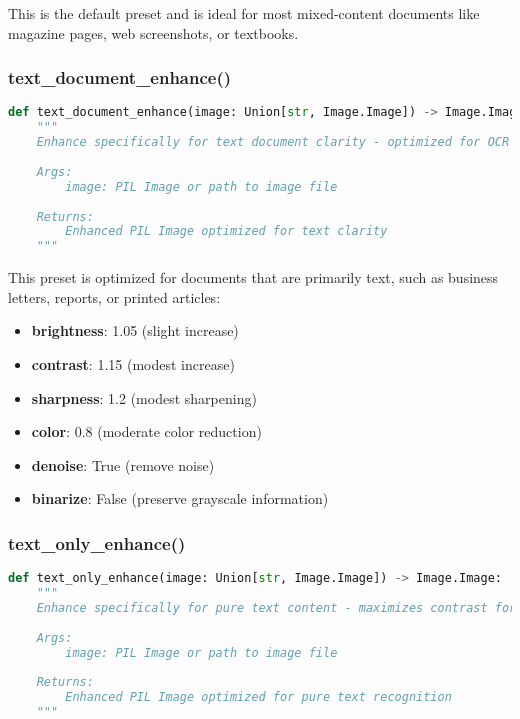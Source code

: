 This is the default preset and is ideal for most mixed-content documents like magazine pages, web screenshots, or textbooks.

\subsubsection{text\_document\_enhance()}
\begin{lstlisting}[language=Python, caption=Text Document Enhancement Function]
def text_document_enhance(image: Union[str, Image.Image]) -> Image.Image:
    """
    Enhance specifically for text document clarity - optimized for OCR
    
    Args:
        image: PIL Image or path to image file
        
    Returns:
        Enhanced PIL Image optimized for text clarity
    """
\end{lstlisting}

This preset is optimized for documents that are primarily text, such as business letters, reports, or printed articles:

\begin{itemize}
    \item \textbf{brightness}: 1.05 (slight increase)
    \item \textbf{contrast}: 1.15 (modest increase)
    \item \textbf{sharpness}: 1.2 (modest sharpening)
    \item \textbf{color}: 0.8 (moderate color reduction)
    \item \textbf{denoise}: True (remove noise)
    \item \textbf{binarize}: False (preserve grayscale information)
\end{itemize}

\subsubsection{text\_only\_enhance()}
\begin{lstlisting}[language=Python, caption=Pure Text Enhancement Function]
def text_only_enhance(image: Union[str, Image.Image]) -> Image.Image:
    """
    Enhance specifically for pure text content - maximizes contrast for OCR
    
    Args:
        image: PIL Image or path to image file
        
    Returns:
        Enhanced PIL Image optimized for pure text recognition
    """
\end{lstlisting}

